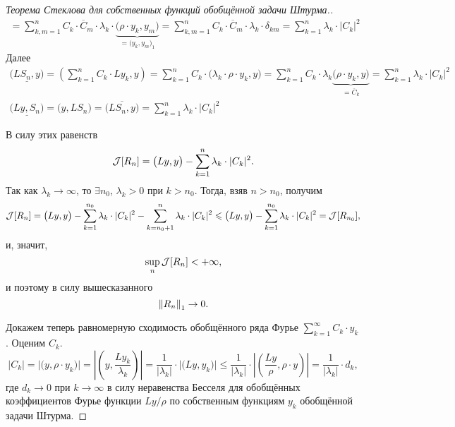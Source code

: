 \begin{proof}[Теорема Стеклова для собственных функций обобщённой задачи Штурма.]
\begin{multline*}
		=\sum\limits_{k,m=1}^n C_k\cdot\overline{C}_m\cdot\lambda_k\cdot\underbrace{\big(\rho\cdot y_k,y_m\big)}_{\textstyle=\big(y_k,y_m\big)_1}=\sum\limits_{k,m=1}^n C_k\cdot\overline{C}_m\cdot\lambda_k\cdot\delta_{km}=\sum\limits_{k=1}^n\lambda_k\cdot|C_k|^2
	\end{multline*}
	Далее
	\begin{gather*}
		\underline{\big(LS_n,y\big)}=\left(\sum\limits_{k=1}^n C_k\cdot Ly_k,y\right)=\sum\limits_{k=1}^nC_k\cdot\big(\lambda_k\cdot\rho\cdot y_k,y\big)=\sum\limits_{k=1}^n C_k\cdot\lambda_k\underbrace{\big(\rho\cdot y_k,y\big)}_{\textstyle=\overline{C}_k}=\sum\limits_{k=1}^n\lambda_k\cdot|C_k|^2\\
		\underline{\big(Ly,S_n\big)}=\big(y,LS_n\big)=\overline{\big(LS_n,y\big)}=\sum\limits_{k=1}^n\lambda_k\cdot|C_k|^2
	\end{gather*}
	
	В силу этих равенств
	\begin{equation*}
		\hfill\J[R_n]=\big(Ly,y\big)-\sum\limits_{k=1}^n\lambda_k\cdot|C_k|^2.\hfill
	\end{equation*}
	Так как $\lambda_k\to\infty$, то $\exists n_0$, $\lambda_k>0$ при $k>n_0$. Тогда, взяв $n>n_0$, получим 
	\begin{equation*}
		\hfill\J[R_n]=\big(Ly,y\big)-\sum\limits_{k=1}^{n_0}\lambda_k\cdot|C_k|^2-\sum\limits_{k=n_0+1}^n\lambda_k\cdot|C_k|^2\leqslant\big(Ly,y\big)-\sum\limits_{k=1}^{n_0}\lambda_k\cdot|C_k|^2=\J[R_{n_0}],\hfill
	\end{equation*}
	и, значит, 
	\begin{equation*}
		\hfill\sup\limits_{n}\J[R_n]<+\infty,\hfill
	\end{equation*}
	и поэтому в силу вышесказанного 
	\begin{equation*}
		\hfill\norm{R_n}_1\to0.\hfill
	\end{equation*}
	
	Докажем теперь равномерную сходимость обобщённого ряда Фурье $\displaystyle\sum\limits_{k=1}^{\infty}C_k\cdot y_k$. Оценим $C_k$.
	\begin{equation*}
		|C_k|=\big|\big(y,\rho\cdot y_k\big)\big|=\left|\left(y,\frac{Ly_k}{\lambda_k}\right)\right|=\frac1{|\lambda_k|}\cdot\big|\big(Ly,y_k\big)\big|\leqslant\frac1{|\lambda_k|}\cdot\left|\left(\frac{Ly}{\rho},\rho\cdot y\right)\right|=\frac1{|\lambda_k|}\cdot d_k,
	\end{equation*} 
	где $d_k\to0$ при $k\to\infty$ в силу неравенства Бесселя для обобщённых коэффициентов Фурье функции $Ly/\rho$ по собственным функциям $y_k$ обобщённой задачи Штурма.
	

\end{proof}
